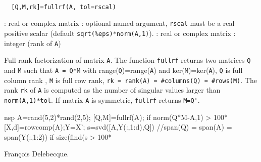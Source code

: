 \begin{mandesc}
   \\ %
\end{mandesc}
\begin{calling_sequence}
\begin{verbatim}
  [Q,M,rk]=fullrf(A, tol=rscal)  
\end{verbatim}
\end{calling_sequence}
\begin{parameters}
  \begin{varlist}
    : real or complex matrix
    : optional named argument, \verb+rscal+ must be  a real 
    positive scalar (default \verb+sqrt(%eps)*norm(A,1)+).
    : real or complex matrix
    : integer (rank of \verb!A!)
  \end{varlist}
\end{parameters}
\begin{mandescription}
  Full rank factorization of matrix \verb!A!. The function \verb!fullrf! returns
  two matrices \verb!Q! and \verb!M! such that \verb!A = Q*M!  with
  range(\verb!Q!)=range(\verb!A!) and ker(\verb!M!)=ker(\verb!A!), \verb!Q! is
  full column rank , \verb!M! is full row rank,
  \verb!rk = rank(A) = #columns(Q) = #rows(M)!. The rank \verb!rk! of \verb!A!
  is computed as the number of singular values larger than \verb!norm(A,1)*tol!.
  If matrix \verb!A! is symmetric, \verb!fullrf! returns \verb!M=Q'!.
\end{mandescription}
\begin{examples}
  \begin{mintednsp}{nsp}
    A=rand(5,2)*rand(2,5);
    [Q,M]=fullrf(A);
    if norm(Q*M-A,1) > 100*%
    [X,d]=rowcomp(A);Y=X';
    s=svd([A,Y(:,1:d),Q]) //span(Q) = span(A) = span(Y(:,1:2))
    if size(find(s > 100*%
  \end{mintednsp}
\end{examples}
\begin{manseealso}
     
     
\end{manseealso}
\begin{authors}
  Fran\c{c}ois Delebecque.
\end{authors}
